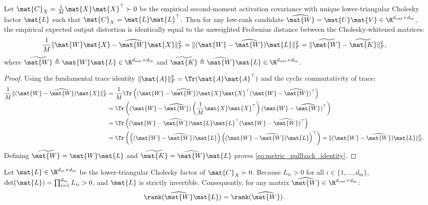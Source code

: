 \begin{lemma}
\label{lem:metric_pullback}
Let $\mat{C}_X = \frac{1}{M} \mat{X} \mat{X}^\top \succ 0$ be the empirical second-moment activation covariance with unique lower-triangular Cholesky factor $\mat{L}$ such that $\mat{C}_X = \mat{L} \mat{L}^\top$. Then for any low-rank candidate $\widehat{\mat{W}} = \mat{U} \mat{V} \in \R^{d_{\text{out}} \times d_{\text{in}}}$, the empirical expected output distortion is identically equal to the unweighted Frobenius distance between the Cholesky-whitened matrices:
\begin{equation}
\frac{1}{M} \| \mat{W} \mat{X} - \widehat{\mat{W}} \mat{X} \|_F^2 = \| (\mat{W} - \widehat{\mat{W}}) \mat{L} \|_F^2 = \| \widetilde{\mat{W}} - \widetilde{\mat{K}} \|_F^2,
\label{eq:metric_pullback_identity}
\end{equation}
where $\widetilde{\mat{W}} \triangleq \mat{W} \mat{L} \in \R^{d_{\text{out}} \times d_{\text{in}}}$ and $\widetilde{\mat{K}} \triangleq \widehat{\mat{W}} \mat{L} \in \R^{d_{\text{out}} \times d_{\text{in}}}$.
\end{lemma}

\begin{proof}
Using the fundamental trace identity $\|\mat{A}\|_F^2 = \Tr(\mat{A} \mat{A}^\top)$ and the cyclic commutativity of trace:
\begin{align}
\frac{1}{M} \| (\mat{W} - \widehat{\mat{W}}) \mat{X} \|_F^2 &= \frac{1}{M} \Tr\left( (\mat{W} - \widehat{\mat{W}}) \mat{X} \mat{X}^\top (\mat{W} - \widehat{\mat{W}})^\top \right) \nonumber \\
&= \Tr\left( (\mat{W} - \widehat{\mat{W}}) \left( \frac{1}{M} \mat{X} \mat{X}^\top \right) (\mat{W} - \widehat{\mat{W}})^\top \right) \nonumber \\
&= \Tr\left( (\mat{W} - \widehat{\mat{W}}) \mat{L} \mat{L}^\top (\mat{W} - \widehat{\mat{W}})^\top \right) \nonumber \\
&= \Tr\left( \left( (\mat{W} - \widehat{\mat{W}}) \mat{L} \right) \left( (\mat{W} - \widehat{\mat{W}}) \mat{L} \right)^\top \right) = \| (\mat{W} - \widehat{\mat{W}}) \mat{L} \|_F^2.
\end{align}
Defining $\widetilde{\mat{W}} = \mat{W} \mat{L}$ and $\widetilde{\mat{K}} = \widehat{\mat{W}} \mat{L}$ proves \eqref{eq:metric_pullback_identity}.
\end{proof}

\begin{lemma}
\label{lem:rank_invariance}
Let $\mat{L} \in \R^{d_{\text{in}} \times d_{\text{in}}}$ be the lower-triangular Cholesky factor of $\mat{C}_X \succ 0$. Because $L_{ii} > 0$ for all $i \in \{1, \dots, d_{\text{in}}\}$, $\det(\mat{L}) = \prod_{i=1}^{d_{\text{in}}} L_{ii} > 0$, and $\mat{L}$ is strictly invertible. Consequently, for any matrix $\widehat{\mat{W}} \in \R^{d_{\text{out}} \times d_{\text{in}}}$:
\begin{equation}
\rank(\widehat{\mat{W}} \mat{L}) = \rank(\widehat{\mat{W}}).
\label{eq:rank_invariance_cholesky}
\end{equation}
\end{lemma}

